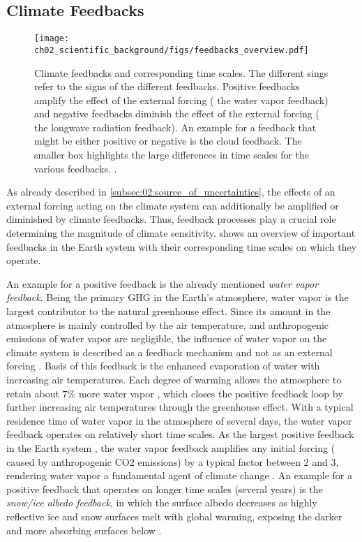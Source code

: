 \subsection{Climate Feedbacks}
\label{subsec:02:climate_feedbacks}

\begin{figure}[!t]
  \centering
  \texttt{[image: 
    ch02\_scientific\_background/figs/feedbacks\_overview.pdf]}
  \caption[
    Climate feedbacks and corresponding time scales.
  ]{
    Climate feedbacks and corresponding time scales. The different sings refer
    to the signs of the different feedbacks. Positive feedbacks amplify the
    effect of the external forcing (\eg{} the water vapor feedback) and
    negative feedbacks diminish the effect of the external forcing (\eg{} the
    longwave radiation feedback). An example for a feedback that might be
    either positive or negative is the cloud feedback. The smaller box
    highlights the large differences in time scales for the various feedbacks.
    .
  }
  \label{fig:02:feedbacks_overview}
\end{figure}

As already described in \cref{subsec:02:source_of_uncertainties}, the effects
of an external forcing acting on the climate system can additionally be
amplified or diminished by climate feedbacks. Thus, feedback processes play a
crucial role determining the magnitude of climate sensitivity.
 shows an overview of important feedbacks in
the Earth system with their corresponding time scales on which they operate.

An example for a positive feedback is the already mentioned \emph{water vapor
  feedback}. Being the primary \ac{GHG} in the Earth's atmosphere, water vapor
is the largest contributor to the natural greenhouse effect. Since its amount
in the atmosphere is mainly controlled by the air temperature, and
anthropogenic emissions of water vapor are negligible, the influence of water
vapor on the climate system is described as a feedback mechanism and not as an
external forcing \autocite{Myhre2013}. Basis of this feedback is the enhanced
evaporation of water with increasing air temperatures. Each degree of warming
allows the atmosphere to retain about $7 \unit{\%}$ more water vapor
\autocite{Myhre2013}, which closes the positive feedback loop by further
increasing air temperatures through the greenhouse effect. With a typical
residence time of water vapor in the atmosphere of several days, the water
vapor feedback operates on relatively short time scales. As the largest
positive feedback in the Earth system \autocite{Soden2006}, the water vapor
feedback amplifies any initial forcing (\eg{} caused by anthropogenic \ac{CO2}
emissions) by a typical factor between $2$ and $3$, rendering water vapor a
fundamental agent of climate change \autocite{Myhre2013}. An example for a
positive feedback that operates on longer time scales (several years) is the
\emph{snow/ice albedo feedback}, in which the surface albedo decreases as
highly reflective ice and snow surfaces melt with global warming, exposing the
darker and more absorbing surfaces below \autocite{Cubasch2013}.

